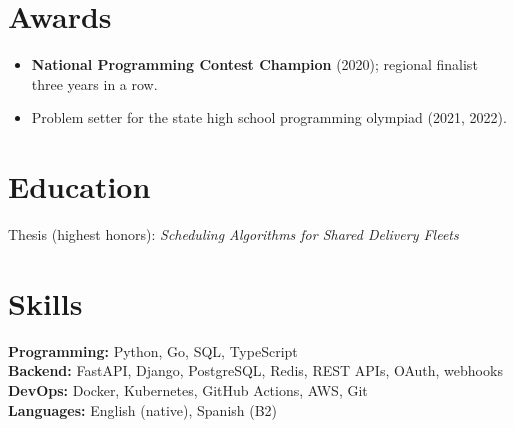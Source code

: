 \documentclass[10pt]{article}
\begin{document}
\section{Awards}
\begin{itemize}
  \item \textbf{National Programming Contest Champion} (2020); regional finalist three years in a row.
  \item Problem setter for the state high school programming olympiad (2021, 2022).
\end{itemize}

\section{Education}
Thesis (highest honors): \textit{Scheduling Algorithms for Shared Delivery Fleets}

\section{Skills}
\textbf{Programming:} Python, Go, SQL, TypeScript\\
\textbf{Backend:} FastAPI, Django, PostgreSQL, Redis, REST APIs, OAuth, webhooks\\
\textbf{DevOps:} Docker, Kubernetes, GitHub Actions, AWS, Git\\
\textbf{Languages:} English (native), Spanish (B2)
\end{document}
